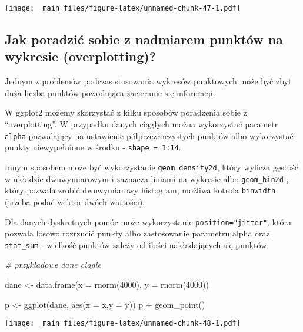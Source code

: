 \documentclass[
]{book}
\newenvironment{Shaded}{\begin{snugshade}}{\end{snugshade}}
\newcommand{\AttributeTok}[1]{\textcolor[rgb]{0.77,0.63,0.00}{#1}}
\newcommand{\CommentTok}[1]{\textcolor[rgb]{0.56,0.35,0.01}{\textit{#1}}}
\newcommand{\DecValTok}[1]{\textcolor[rgb]{0.00,0.00,0.81}{#1}}
\newcommand{\FunctionTok}[1]{\textcolor[rgb]{0.00,0.00,0.00}{#1}}
\newcommand{\NormalTok}[1]{#1}
\newcommand{\OtherTok}[1]{\textcolor[rgb]{0.56,0.35,0.01}{#1}}
\newcommand{\SpecialCharTok}[1]{\textcolor[rgb]{0.00,0.00,0.00}{#1}}
\begin{document}
\texttt{[image: \_main\_files/figure-latex/unnamed-chunk-47-1.pdf]}

\hypertarget{jak-poradziux107-sobie-z-nadmiarem-punktuxf3w-na-wykresie-overplotting}{%
\subsection{Jak poradzić sobie z nadmiarem punktów na wykresie (overplotting)?}\label{jak-poradziux107-sobie-z-nadmiarem-punktuxf3w-na-wykresie-overplotting}}

Jednym z problemów podczas stosowania wykresów punktowych może być zbyt duża liczba punktów powodująca zacieranie się informacji.

W ggplot2 możemy skorzystać z kilku sposobów poradzenia sobie z ``overplotting''. W przypadku danych ciągłych można wykorzystać parametr \texttt{alpha} pozwalający na ustawienie półprzezroczystych punktów albo wykorzystać punkty niewypełnione w środku - \texttt{shape\ =\ 1:14}.

Innym sposobem może być wykorzystanie \texttt{geom\_density2d}, który wylicza gęstość w układzie dwuwymiarowym i zaznacza liniami na wykresie albo \texttt{geom\_bin2d} , który pozwala zrobić dwuwymiarowy histogram, możliwa kotrola \texttt{binwidth} (trzeba podać wektor dwóch wartości).

Dla danych dyskretnych pomóc może wykorzystanie \texttt{position="jitter"}, która pozwala losowo rozrzucić punkty albo zastosowanie parametru alpha oraz \texttt{stat\_sum} - wielkość punktów zależy od ilości nakładających się punktów.

\begin{Shaded}
\begin{Highlighting}[]
\CommentTok{\# przykładowe dane ciągłe}

\NormalTok{dane }\OtherTok{\textless{}{-}} \FunctionTok{data.frame}\NormalTok{(}\AttributeTok{x =} \FunctionTok{rnorm}\NormalTok{(}\DecValTok{4000}\NormalTok{), }\AttributeTok{y =} \FunctionTok{rnorm}\NormalTok{(}\DecValTok{4000}\NormalTok{))}

\NormalTok{p }\OtherTok{\textless{}{-}} \FunctionTok{ggplot}\NormalTok{(dane, }\FunctionTok{aes}\NormalTok{(}\AttributeTok{x =}\NormalTok{ x,}\AttributeTok{y =}\NormalTok{ y))}
\NormalTok{p }\SpecialCharTok{+} \FunctionTok{geom\_point}\NormalTok{()}
\end{Highlighting}
\end{Shaded}

\texttt{[image: \_main\_files/figure-latex/unnamed-chunk-48-1.pdf]}
\end{document}

